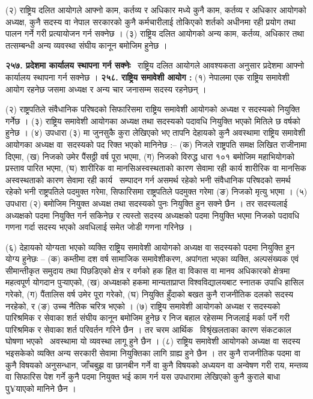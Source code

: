 (२) राष्ट्रिय दलित आयोगले आफ्नो काम, कर्तव्य र अधिकार मध्ये कुनै काम, कर्तव्य र अधिकार आयोगको अध्यक्ष, कुनै सदस्य वा नेपाल सरकारको कुनै कर्मचारीलाई तोकिएको शर्तको अधीनमा रही प्रयोग तथा पालन गर्ने गरी प्रत्यायोजन गर्न सक्नेछ ।
(३) राष्ट्रिय दलित आयोगको अन्य काम, कर्तव्य, अधिकार तथा तत्सम्बन्धी अन्य व्यवस्था संघीय कानून बमोजिम हुनेछ ।

\textbf{२५७. प्रदेशमा कार्यालय स्थापना गर्न सक्नेः}  राष्ट्रिय दलित आयोगले आवश्यकता अनुसार प्रदेशमा आफ्नो कार्यालय स्थापना गर्न सक्नेछ ।
\textbf{२५८. राष्ट्रिय समावेशी आयोग :} (१) नेपालमा एक राष्ट्रिय समावेशी आयोग रहनेछ जसमा अध्यक्ष र अन्य चार जनासम्म सदस्य रहनेछन् ।

(२) राष्ट्रपतिले संवैधानिक परिषदको सिफारिसमा राष्ट्रिय समावेशी आयोगको अध्यक्ष र सदस्यको नियुक्ति गर्नेेछ ।
(३) राष्ट्रिय समावेशी आयोगका अध्यक्ष तथा सदस्यको पदावधि नियुक्ति भएको मितिले छ वर्षको हुनेछ ।
(४) उपधारा (३) मा जुनसुकै कुरा लेखिएको भए तापनि देहायको कुनै अवस्थामा राष्ट्रिय समावेशी आयोगका अध्यक्ष वा सदस्यको पद रिक्त भएको मानिनेछ :–
(क) निजले राष्ट्रपति समक्ष लिखित राजीनामा दिएमा,
(ख) निजको उमेर पैंसठ्ठी वर्ष पूरा भएमा,
(ग) निजको विरुद्ध धारा १०१ बमोजिम महाभियोगको प्रस्ताव पारित भएमा,
(घ) शारीरिक वा मानसिअस्वस्थताको कारण सेवामा रही कार्य शारीरिक वा मानसिक अस्वस्थताको कारण सेवामा रही कार्य  सम्पादन गर्न असमर्थ रहेको भनी संवैधानिक परिषदको समर्थ रहेको भनी राष्ट्रपतिले पदमुक्त गरेमा, सिफारिसमा राष्ट्रपतिले पदमुक्त गरेमा
(ङ) निजको मृत्यु भएमा ।
(५) उपधारा (२) बमोजिम नियुक्त अध्यक्ष तथा सदस्यको पुनः नियुक्ति हुन सक्ने छैन ।
तर सदस्यलाई अध्यक्षको पदमा नियुक्ति गर्न सकिनेछ र त्यस्तो सदस्य अध्यक्षको पदमा नियुक्ति भएमा निजको पदावधि गणना गर्दा सदस्य भएको अवधिलाई समेत जोडी गणना गरिनेछ ।

(६) देहायको योग्यता भएको व्यक्ति राष्ट्रिय समावेशी आयोगको अध्यक्ष वा सदस्यको पदमा नियुक्ति हुन योग्य हुनेछः –
(क) कम्तीमा दश वर्ष सामाजिक समावेशीकरण, अपांगता भएका व्यक्ति, अल्पसंख्यक एवं सीमान्तीकृत समुदाय तथा पिछडिएको क्षेत्र र वर्गको हक हित वा विकास वा मानव अधिकारको क्षेत्रमा महत्वपूर्ण योगदान पुर्‍याएको,
(ख) अध्यक्षको हकमा मान्यताप्राप्त विश्वविद्यालयबाट स्नातक उपाधि हासिल गरेको,
(ग) पैंतालिस वर्ष उमेर पूरा गरेको,
(घ) नियुक्ति हुँदाको बखत कुनै राजनीतिक दलको सदस्य नरहेको, र
(ङ) उच्च नैतिक चरित्र भएको ।
(७) राष्ट्रिय समावेशी आयोगको अध्यक्ष र सदस्यको पारिश्रमिक र सेवाका शर्त संघीय कानून बमोजिम हुनेछ र निज बहाल रहेसम्म निजलाई मर्का पर्ने गरी पारिश्रमिक र सेवाका शर्त परिवर्तन गरिने छैन ।
तर चरम आर्थिक  विश्रृंखलताका कारण संकटकाल घोषणा भएको  अवस्थामा यो व्यवस्था लागू हुने छैन ।
(८) राष्ट्रिय समावेशी आयोगको अध्यक्ष वा सदस्य भइसकेको व्यक्ति अन्य सरकारी सेवामा नियुक्तिका लागि ग्राह्य हुने छैन ।
तर कुनै राजनीतिक पदमा वा कुनै विषयको अनुसन्धान, जाँचबुझ वा छानबीन गर्ने वा कुनै विषयको अध्ययन वा अन्वेषण गरी राय, मन्तव्य वा सिफारिस पेश गर्ने कुनै पदमा नियुक्त भई काम गर्न यस उपधारामा लेखिएको कुनै कुराले बाधा पु¥याएको मानिने छैन ।

